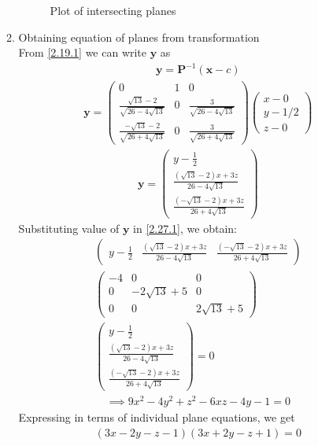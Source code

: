 \documentclass[journal,12pt,twocolumn]{IEEEtran}
\let\vec\mathbf
\numberwithin{equation}{subsection}
\newcommand{\myvec}[1]{\ensuremath{\begin{pmatrix}#1\end{pmatrix}}}
\begin{document}
\begin{enumerate}
\begin{enumerate}
\begin{figure}[h]
    \caption{Plot of intersecting planes}
    \label{Fig :1}
\end{figure}
\item Obtaining equation of planes from transformation\\
From \eqref{2.19.1} we can write $\vec{y}$ as
\begin{align}
\vec{y} = \vec{P}^{-1}(\vec{x} - c)
\end{align}
\begin{align}
\vec{y} =  \myvec{0&1&0\\
\frac{\sqrt{13} -2}{\sqrt{26-4\sqrt{13}}}&0&\frac{3}{\sqrt{26-4\sqrt{13}}}\\
\frac{-\sqrt{13} -2}{\sqrt{26+4\sqrt{13}}}&0&\frac{3}{\sqrt{26+4\sqrt{13}}}
} \myvec{x-0\\y-1/2\\z-0}
\end{align}
\begin{align}
\vec{y} = \myvec{y-\frac{1}{2}\\ \frac{(\sqrt{13} -2)x +3z}{26-4\sqrt{13}}\\\frac{(-\sqrt{13} -2)x +3z}{26+4\sqrt{13}}}
\end{align}
Substituting value of $\vec{y}$ in \eqref{2.27.1}, we obtain:
\begin{multline}
\myvec{y-\frac{1}{2}&\frac{(\sqrt{13} -2)x +3z}{26-4\sqrt{13}}&\frac{(-\sqrt{13} -2)x +3z}{26+4\sqrt{13}}}\\
\myvec{-4&0&0\\0&-2\sqrt{13}+5&0\\0&0&2\sqrt{13}+5}\\ \myvec{y-\frac{1}{2}\\ \frac{(\sqrt{13} -2)x +3z}{26-4\sqrt{13}}\\\frac{(-\sqrt{13} -2)x +3z}{26+4\sqrt{13}}} = 0
\end{multline}
\begin{align}
\implies   9x^2 -4y^2 +z^2 -6xz -4y -1 =0
\end{align}
Expressing in terms of individual plane equations, we get
\begin{align}
   ( 3x- 2y -z -1)( 3x +2y-z +1 ) = 0 
\end{align}
\end{enumerate}


\end{enumerate}
\end{document}

